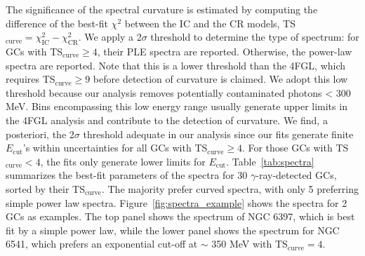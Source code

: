 \documentclass[doublespace,draft,nopageskip]{VTthesis} %
\begin{document}
The significance of the spectral curvature is estimated by computing the difference of the best-fit $\chi^2$ between the IC and the CR models, TS$_\mathrm{curve} = \chi^2_\text{IC} - \chi^2_\text{CR}.$ We apply a 2$\sigma$ threshold to determine the type of spectrum: for GCs with TS$_\mathrm{curve} \ge 4$, their PLE spectra are reported. Otherwise, the power-law spectra are reported. Note that this is a lower threshold than the 4FGL, which requires TS$_\mathrm{curve} \ge 9$ before detection of curvature is claimed. We adopt this low threshold because our analysis removes potentially contaminated photons < 300 MeV. Bins encompassing this low energy range usually generate upper limits in the 4FGL analysis and contribute to the detection of curvature. We find, a posteriori, the 2$\sigma$ threshold adequate in our analysis since our fits generate finite $E_\mathrm{cut}$'s within uncertainties for all GCs with TS$_\mathrm{curve} \ge 4$. For those GCs with TS$_\mathrm{curve} < 4$, the fits only generate lower limits for $E_\mathrm{cut}$. Table~\ref{tab:spectra} summarizes the best-fit parameters of the spectra for 30 $\gamma$-ray-detected GCs, sorted by their TS$_\mathrm{curve}$. The majority prefer curved spectra, with only 5 preferring simple power law spectra. Figure~\ref{fig:spectra_example} shows the spectra for 2 GCs as examples. The top panel shows the spectrum of NGC 6397, which is best fit by a simple power law, while the lower panel shows the spectrum for NGC 6541, which prefers an exponential cut-off at $\sim$ 350 MeV with TS$_\mathrm{curve}=4$. 
\end{document}
